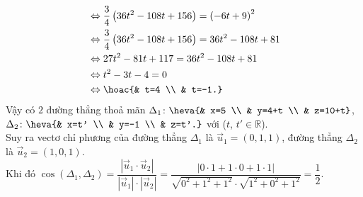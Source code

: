 \begin{ex}
{\begin{align*}
			&\Leftrightarrow\dfrac{3}{4}\left(36t^2 - 108t + 156\right) = \left(-6t + 9\right)^2\\ 
			&\Leftrightarrow\dfrac{3}{4}\left(36t^2 - 108t + 156\right)  = 36t^2 - 108t + 81\\
			&\Leftrightarrow27t^2 - 81t + 117 = 36t^2  - 108t + 81\\
			&\Leftrightarrow t^2 - 3t -  4 = 0\\
			&\Leftrightarrow 
			\hoac{& t=4 \\ & t=-1.} 
		\end{align*}
		Vậy có $2$ đường thẳng thoả mãn $\Delta_1\colon  \heva{& x=5 \\ & y=4+t \\ & z=10+t}$, $\Delta_2\colon \heva{& x=t' \\ & y=-1 \\ & z=t'.}$ với ($t$, $t'\in\mathbb{R}$).\\
		Suy ra vectơ chỉ phương  của đường thẳng $\Delta_1$ là $\overrightarrow{u}_1=(0,1,1)$, đường thẳng $\Delta_2$ là $\overrightarrow{u}_2=(1,0,1)$.\\
		Khi đó $\cos \left(\Delta_1, \Delta_2\right)=\dfrac{\left|\overrightarrow{u}_1 \cdot \overrightarrow{u}_2\right|}{|\overrightarrow{u}_1|\cdot|\overrightarrow{u}_2|}=\dfrac{|0 \cdot 1+1 \cdot 0+1 \cdot 1|}{\sqrt{0^2+1^2+1^2}\cdot\sqrt{1^2+0^2+1^2}}  = \dfrac{1}{2}$.
	} 
\end{ex}

